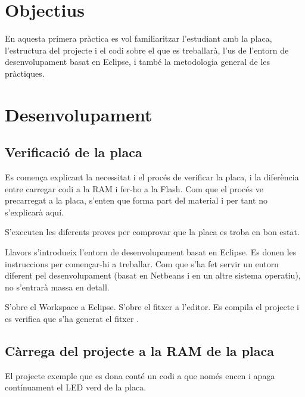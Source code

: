 
\section{Objectius}

En aquesta primera pràctica es vol familiaritzar l'estudiant amb la placa,
l'estructura del projecte i el codi sobre el que es treballarà, l'us de l'entorn de
desenvolupament basat en Eclipse, i també la metodologia general de les
pràctiques.

\section{Desenvolupament}


\subsection{Verificació de la placa}

Es comença explicant la necessitat i el procés de verificar la placa,
i la diferència entre carregar codi a la RAM i fer-ho a la Flash. Com que
el procés ve precarregat a la placa, s'enten que forma part del material i
per tant no s'explicarà aquí.

S'executen les diferents proves per comprovar que la placa es troba en bon estat.

Llavors s'introdueix l'entorn de desenvolupament basat en Eclipse. Es donen
les instruccions per començar-hi a treballar. Com que s'ha fet servir un entorn
diferent pel desenvolupament (basat en Netbeans i en un altre sistema operatiu),
no s'entrarà massa en detall.

S'obre el Workspace a Eclipse. S'obre el fitxer  a l'editor.
Es compila el projecte i es verifica que s'ha generat el fitxer .


\subsection{Càrrega del projecte a la RAM de la placa}

El projecte exemple que es dona conté un codi a  que només encen
i apaga contínuament el LED verd de la placa.

